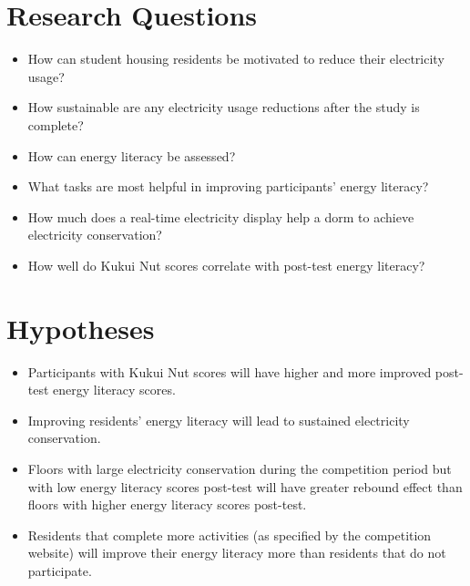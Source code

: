 \section{Research Questions}

\begin{itemize}

\item How can student housing residents be motivated to reduce their electricity usage?

\item How sustainable are any electricity usage reductions after the study is complete?

\item How can energy literacy be assessed?

\item What tasks are most helpful in improving participants' energy literacy?

\item How much does a real-time electricity display help a dorm to achieve electricity conservation?

\item How well do Kukui Nut scores correlate with post-test energy literacy?

\end{itemize}


\section{Hypotheses}

\begin{itemize}

\item Participants with Kukui Nut scores will have higher and more improved post-test energy literacy scores.

\item Improving residents' energy literacy will lead to sustained electricity conservation.

\item Floors with large electricity conservation during the competition period but with low energy literacy scores post-test will have greater rebound effect than floors with higher energy literacy scores post-test.

\item Residents that complete more activities (as specified by the competition website) will improve their energy literacy more than residents that do not participate.

\end{itemize}